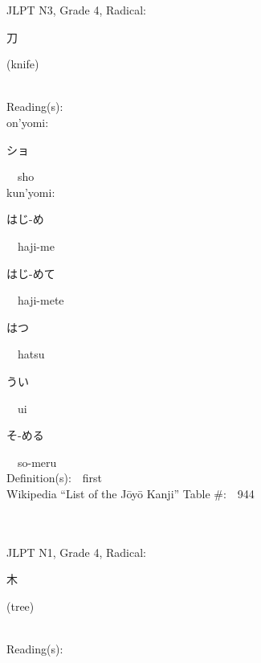 \begin{multicols}{2}
{JLPT N3, Grade 4, Radical:\ \ {\begin{CJK}{UTF8}{min} 刀 \end{CJK}} (knife) } \\
Reading(s):\ \ \\
{\hspace*{1em}}on'yomi:\ \ \\
{\hspace*{2em}}{\begin{CJK}{UTF8}{min} ショ \end{CJK}}\ \ sho\ \ \\
{\hspace*{1em}}kun'yomi:\ \ \\
{\hspace*{2em}}{\begin{CJK}{UTF8}{min} はじ-め \end{CJK}}\ \ haji-me\ \ \\
{\hspace*{2em}}{\begin{CJK}{UTF8}{min} はじ-めて \end{CJK}}\ \ haji-mete\ \ \\
{\hspace*{2em}}{\begin{CJK}{UTF8}{min} はつ \end{CJK}}\ \ hatsu\ \ \\
{\hspace*{2em}}{\begin{CJK}{UTF8}{min} うい \end{CJK}}\ \ ui\ \ \\
{\hspace*{2em}}{\begin{CJK}{UTF8}{min} そ-める \end{CJK}}\ \ so-meru\ \ \\
Definition(s):\ \ first \\
Wikipedia ``List of the J\=oy\=o Kanji'' Table \#:\ \ 944 \\
\ \ \\
{\fontsize{34pt}{40pt}  }\ \ \\  %
{JLPT N1, Grade 4, Radical:\ \ {\begin{CJK}{UTF8}{min} 木 \end{CJK}} (tree) } \\
Reading(s):\ \ \\

\end{multicols}
